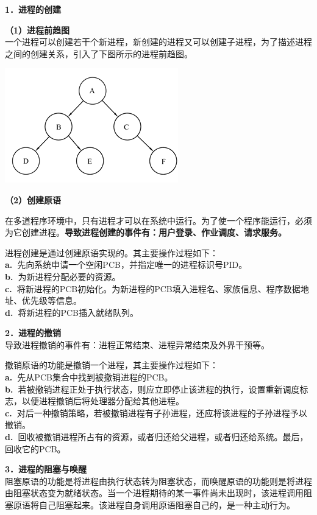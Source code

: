 \textbf{{1．进程的创建}}

\textbf{（1）进程前趋图}\\
一个进程可以创建若干个新进程，新创建的进程又可以创建子进程，为了描述进程之间的创建关系，引入了下图所示的进程前趋图。

\includegraphics[width=2.95833in,height=1.95833in]{png-jpeg-pics/FE26B0A670DD08E1F9CF55E58FFA9A29.png}

\textbf{（2）创建原语}

在多道程序环境中，只有进程才可以在系统中运行。为了使一个程序能运行，必须为它创建进程。\textbf{导致进程创建的事件有：用户登录、作业调度、请求服务。}

{进程创建}{是通过创建原语实现的。其主要操}{作}{过程}{如下：}\\
\textbf{a.~}先向系统申请一个空闲PCB，并指定唯一的进程标识号PID。\\
\textbf{b.~}为新进程分配必要的资源。\\
\textbf{c.~}将新进程的PCB初始化。为新进程的PCB填入进程名、家族信息、程序数据地址、优先级等信息。\\
\textbf{d.~}将新进程的PCB插入就绪队列。

\textbf{{2．进程的撤销}}\\
导致进程撤销的事件有：进程正常结束、进程异常结束及外界干预等。

{撤销原语的功能是}{撤销一个进程}{，其主要操作过程如下：}\\
\textbf{a.~}先从PCB集合中找到被撤销进程的PCB。\\
\textbf{b.~}若被撤销进程正处于执行状态，则应立即停止该进程的执行，设置重新调度标志，以便进程撤销后将处理器分配给其他进程。\\
\textbf{c.~}对后一种撤销策略，若被撤销进程有子孙进程，还应将该进程的子孙进程予以撤销。\\
\textbf{d.~}回收被撤销进程所占有的资源，或者归还给父进程，或者归还给系统。最后，回收它的PCB。

\textbf{{3．进程的阻塞与唤醒}}\\
阻塞原语的功能是将进程由执行状态转为阻塞状态，而唤醒原语的功能则是将进程由阻塞状态变为就绪状态。{当一个进程期待的某一事件尚未出现时，该进程调用阻塞原语将自己阻塞起来。}{该进程自身调用原语阻塞自己的，是一种主动行为。}

